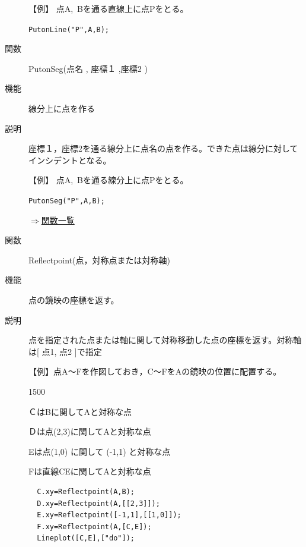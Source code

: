 \documentclass[papersize,a4paper,12pt,uplatex]{jsarticle}
\begin{document}
\begin{description}
\vspace{\baselineskip}
【例】  点A,\ Bを通る直線上に点Pをとる。

  \verb|PutonLine("P",A,B);|

\vspace{\baselineskip}
\hypertarget{putonseg}{}
\item[関数]  PutonSeg(点名 , 座標１ ,座標2 )
\item[機能]  線分上に点を作る
\item[説明]  座標１，座標2を通る線分上に点名の点を作る。できた点は線分に対してインシデントとなる。

\vspace{\baselineskip}
【例】  点A,\ Bを通る線分上に点Pをとる。

    \verb|PutonSeg("P",A,B);|

\begin{flushright}  \hyperlink{functionlist}{$\Rightarrow$関数一覧}\end{flushright}

\vspace{\baselineskip}
\hypertarget{reflectpoint}{}
\item[関数]  Reflectpoint(点，対称点または対称軸)
\item[機能]  点の鏡映の座標を返す。
\item[説明]  点を指定された点または軸に関して対称移動した点の座標を返す。対称軸は[ 点1, 点2 ]で指定

\vspace{\baselineskip}
【例】点A〜Fを作図しておき，C〜FをAの鏡映の位置に配置する。

\begin{layer}{150}{0}
\end{layer}

\hspace{5mm} ＣはBに関してAと対称な点

\hspace{5mm} Ｄは点(2,3)に関してAと対称な点

\hspace{5mm} Eは点(1,0) に関して (-1,1) と対称な点

\hspace{5mm} Fは直線CEに関してAと対称な点

\begin{verbatim}
  C.xy=Reflectpoint(A,B);
  D.xy=Reflectpoint(A,[[2,3]]);
  E.xy=Reflectpoint([-1,1],[[1,0]]);
  F.xy=Reflectpoint(A,[C,E]);
  Lineplot([C,E],["do"]);
\end{verbatim}


\end{description}
\end{document}

